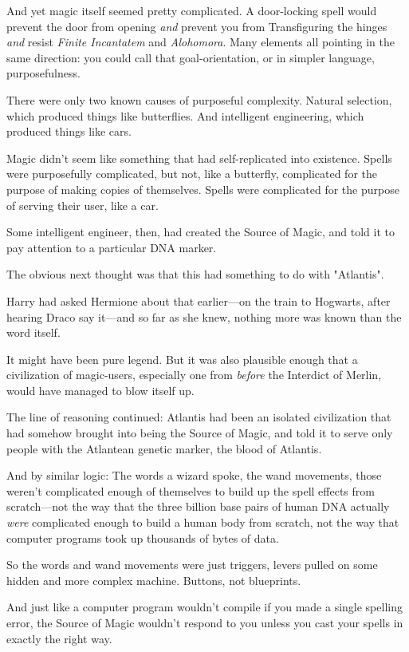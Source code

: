 And yet magic itself seemed pretty complicated. A door-locking spell would
prevent the door from opening \emph{and} prevent you from Transfiguring the
hinges \emph{and} resist \emph{Finite Incantatem} and \emph{Alohomora}. Many
elements all pointing in the same direction: you could call that
goal-orientation, or in simpler language, purposefulness.

There were only two known causes of purposeful complexity. Natural selection,
which produced things like butterflies. And intelligent engineering, which
produced things like cars.

Magic didn't seem like something that had self-replicated into existence.
Spells were purposefully complicated, but not, like a butterfly, complicated
for the purpose of making copies of themselves. Spells were complicated for the
purpose of serving their user, like a car.

Some intelligent engineer, then, had created the Source of Magic, and told it
to pay attention to a particular DNA marker.

The obvious next thought was that this had something to do with "Atlantis".

Harry had asked Hermione about that earlier---on the train to Hogwarts, after
hearing Draco say it---and so far as she knew, nothing more was known than the
word itself.

It might have been pure legend. But it was also plausible enough that a
civilization of magic-users, especially one from \emph{before} the Interdict of
Merlin, would have managed to blow itself up.

The line of reasoning continued: Atlantis had been an isolated civilization
that had somehow brought into being the Source of Magic, and told it to serve
only people with the Atlantean genetic marker, the blood of Atlantis.

And by similar logic: The words a wizard spoke, the wand movements, those
weren't complicated enough of themselves to build up the spell effects from
scratch---not the way that the three billion base pairs of human DNA actually
\emph{were} complicated enough to build a human body from scratch, not the way
that computer programs took up thousands of bytes of data.

So the words and wand movements were just triggers, levers pulled on some
hidden and more complex machine. Buttons, not blueprints.

And just like a computer program wouldn't compile if you made a single spelling
error, the Source of Magic wouldn't respond to you unless you cast your spells
in exactly the right way.

